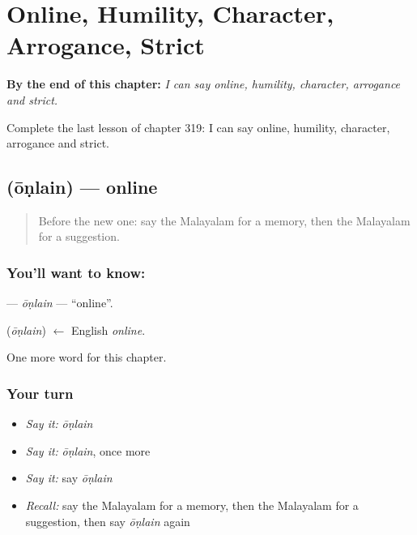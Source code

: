 
\chapter{Online, Humility, Character, Arrogance, Strict}
\label{ch:ml-online-humility-character-arrogance-strict}

\begin{chapteropening}
\textbf{By the end of this chapter:} \emph{I can say online, humility, character, arrogance and strict.}

Complete the last lesson of chapter 319: I can say online, humility, character, arrogance and strict.
\end{chapteropening}

\section[\texorpdfstring{\ml{ഓൺലൈൻ} (ōṇlain)}{ഓൺലൈൻ (ōṇlain)}]{ (ōṇlain) — online}

\label{lesson:ML-C319-onlain}



\begin{quote}
Before the new one: say the Malayalam for a memory, then the Malayalam for a suggestion.
\end{quote}

\subsection*{You'll want to know: }
\textbf{} — \emph{ōṇlain} — \textquotedblleft{}online\textquotedblright{}.

\begin{cousinweb}
\textbf{} (\emph{ōṇlain}) $\leftarrow$ English \emph{online}.
\end{cousinweb}

\begin{grammarlens}[title={What you've built}]
One more word for this chapter.
\end{grammarlens}

\subsection*{Your turn}
\begin{itemize}
\raggedright
  \item \emph{Say it:} \emph{ōṇlain}
  \item \emph{Say it:} \emph{ōṇlain}, once more
  \item \emph{Say it:} say \emph{ōṇlain}
  \item \emph{Recall:} say the Malayalam for a memory, then the Malayalam for a suggestion, then say \emph{ōṇlain} again
\end{itemize}

